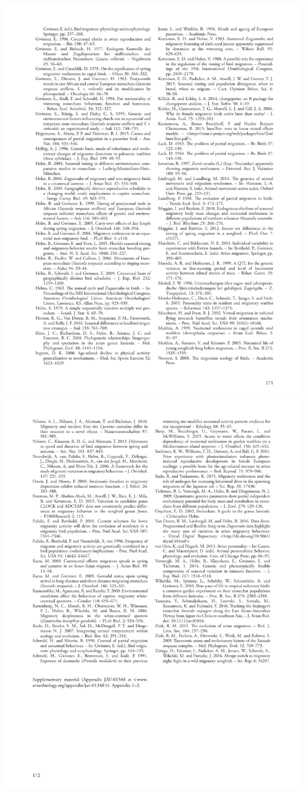 \documentclass[a4paper, twoside]{templates/ociamthesis}
\begin{document}
\includegraphics[width=1\linewidth]{pdf_chapters/zug/zug_crop_Part17}
\includegraphics[width=1\linewidth]{pdf_chapters/zug/zug_crop_Part18}
\end{document}

